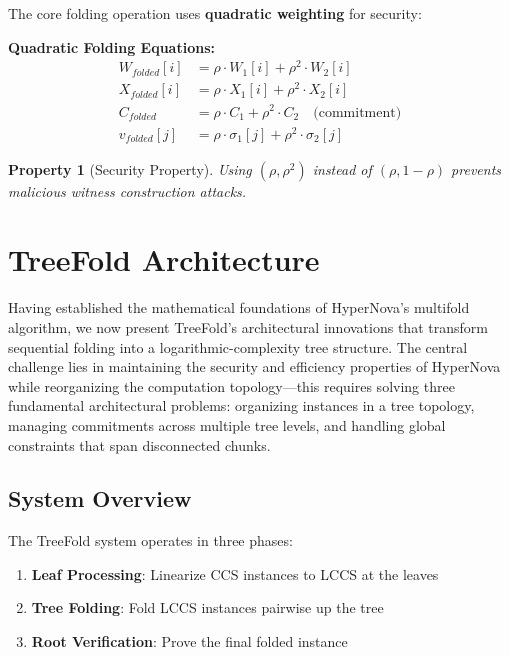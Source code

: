 \documentclass[11pt,a4paper]{article}
\theoremstyle{plain}
\newtheorem{property}[theorem]{Property}
\theoremstyle{definition}
\begin{document}
The core folding operation uses \textbf{quadratic weighting} for security:

\begin{highlight}
\textbf{Quadratic Folding Equations:}
\begin{align}
  W_{folded}[i] &= \rho \cdot W_1[i] + \rho^2 \cdot W_2[i] \\
  X_{folded}[i] &= \rho \cdot X_1[i] + \rho^2 \cdot X_2[i] \\
  C_{folded} &= \rho \cdot C_1 + \rho^2 \cdot C_2 \quad \text{(commitment)} \\
  v_{folded}[j] &= \rho \cdot \sigma_1[j] + \rho^2 \cdot \sigma_2[j]
\end{align}
\end{highlight}

\begin{property}[Security Property]
Using $(\rho, \rho^2)$ instead of $(\rho, 1-\rho)$ prevents malicious witness construction attacks.
\end{property}

\section{TreeFold Architecture}

Having established the mathematical foundations of HyperNova's multifold algorithm, we now present TreeFold's architectural innovations that transform sequential folding into a logarithmic-complexity tree structure. The central challenge lies in maintaining the security and efficiency properties of HyperNova while reorganizing the computation topology—this requires solving three fundamental architectural problems: organizing instances in a tree topology, managing commitments across multiple tree levels, and handling global constraints that span disconnected chunks.

\subsection{System Overview}

The TreeFold system operates in three phases:

\begin{enumerate}
\item \textbf{Leaf Processing}: Linearize CCS instances to LCCS at the leaves
\item \textbf{Tree Folding}: Fold LCCS instances pairwise up the tree
\item \textbf{Root Verification}: Prove the final folded instance
\end{enumerate}
\end{document}
